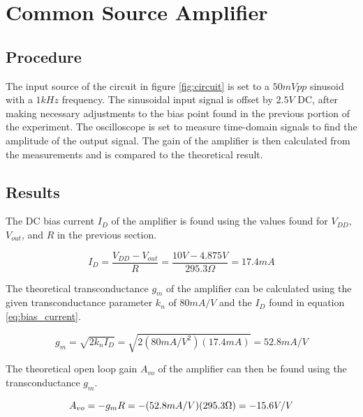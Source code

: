 \section{Common Source Amplifier}

\subsection{Procedure}

The input source of the circuit in figure \ref{fig:circuit} is set to a $50 mVpp$ sinusoid with a $1 kHz$ frequency.
The sinusoidal input signal is offset by $2.5 V$ DC, after making necessary adjustments to the bias point found in the previous portion of the experiment.
The oscilloscope is set to measure time-domain signals to find the amplitude of the output signal.
The gain of the amplifier is then calculated from the measurements and is compared to the theoretical result.

\FloatBarrier

\subsection{Results}

The DC bias current $I_D$ of the amplifier is found using the values found for $V_{DD}$, $V_{out}$, and $R$ in the previous section.

\FloatBarrier

\begin{equation}
	\label{eq:bias_current}
	I_D = \frac{V_{DD}-V_{out}}{R} = \frac{10 V - 4.875 V}{295.3 \Omega} = 17.4 mA
\end{equation}

\FloatBarrier

The theoretical transconductance $g_m$ of the amplifier can be calculated using the given transconductance parameter $k_n$ of $80 mA/V$ and the $I_D$ found in equation \ref{eq:bias_current}.

\FloatBarrier

\begin{equation}
	\label{eq:g_m}
	g_m = \sqrt{2k_nI_D} = \sqrt{2(80 mA/V^2)(17.4 mA)} = 52.8 mA/V
\end{equation}

\FloatBarrier

The theoretical open loop gain $A_{vo}$ of the amplifier can then be found using the transconductance $g_m$.

\FloatBarrier

\begin{equation}
	\label{eq:theoretical_gain}
	A_{vo} = -g_mR = -(52.8 mA/V)(295.3 \Omega) = -15.6 V/V \\
\end{equation}

